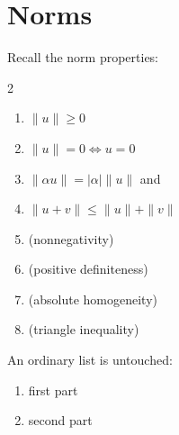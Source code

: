 \section{Norms}

Recall the norm properties:

\begin{multicols}{2}
    \begin{enumerate}
        \item[(a)] $\| u \| \geq 0$
        \item[(b)] $\| u \| = 0 \iff u = 0$
        \item[(c)] $\| \alpha u \| = |\alpha| \| u \|$ and
        \item[(d)] $\| u + v \| \leq \| u \| + \| v \|$
        \item[] (nonnegativity)
        \item[] (positive definiteness)
        \item[] (absolute homogeneity)
        \item[] (triangle inequality)
    \end{enumerate}
\end{multicols}

An ordinary list is untouched:

\begin{enumerate}
    \item first part
    \item second part
\end{enumerate}
